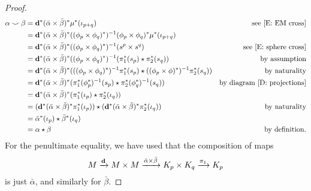 \begin{proof}
\begin{comment}
Now, we consider the diagram
\begin{diagram}
H^{p+q}(M)&\lTo^{\diag^*(\bar \alpha\times \bar \beta)^*}& H^{p+q}(\mc K_p\times \mc K_q)&\lTo^{\mu^*}&H^{p+q}(\mc K_{p+q})\\
&&\dTo^{(\phi_p\times \phi_q)^*}&&\dTo^{\phi_{p+q}}\\
&&H^{p+q}(S^p\times S^q)&\lTo^{\nu^*}&H^{p+q}(S^{p+q}).
\end{diagram} 
As the $p+1$ skeleton of $K_p$ can be taken to be the image of $S^p$ under $\phi_p$, it is standard that the vertical maps are isomorphisms. 

Again by \cite[Section 4.3]{Hatc02}, $\mu^*(\iota_{p+q})=\iota_p\times \iota_q$, so $\alpha\smile \beta=\diag^*(\bar \alpha\times \bar \beta)^*(\iota_p\times \iota_q)$. So we compute as follows.
\end{comment}

\begin{align*}
\alpha\smile \beta&=\mathbf{d}^*(\bar \alpha\times \bar \beta)^*\mu^*(\iota_{p+q})&\text{see \eqref{E: EM cross}}\\
&=\mathbf{d}^*(\bar \alpha\times \bar \beta)^*((\phi_p\times \phi_q)^*)^{-1}(\phi_p\times \phi_q)^*\mu^*(\iota_{p+q})\\
&=\mathbf{d}^*(\bar \alpha\times \bar \beta)^*((\phi_p\times \phi_q)^*)^{-1}(s^p\times s^q)&\text{see \eqref{E: sphere cross}}\\
&=\mathbf{d}^*(\bar \alpha\times \bar \beta)^*((\phi_p\times \phi_q)^*)^{-1}(\pi_1^*(s_p) \star \pi_2^*(s_q))&\text{by assumption}\\
&=\mathbf{d}^*(\bar \alpha\times \bar \beta)^*(((\phi_p\times \phi_q)^*)^{-1}\pi_1^*(s_p) \star ((\phi_p\times \phi)^*)^{-1}\pi_2^*(s_q))&\text{by naturality}\\
&=\mathbf{d}^*(\bar \alpha\times \bar \beta)^*(\pi_1^*(\phi_p^*)^{-1}(s_p) \star \pi_2^*(\phi_q^*)^{-1}(s_q))&\text{by diagram \eqref{D: projections}}\\
&=\mathbf{d}^*(\bar \alpha\times \bar \beta)^*(\pi_1^*(\iota_p) \star \pi_2^*(\iota_q))\\
&=(\mathbf{d}^*(\bar \alpha\times \bar \beta)^*\pi_1^*(\iota_p)) \star (\mathbf{d}^*(\bar \alpha\times \bar \beta)^*\pi_2^*(\iota_q))&\text{by naturality}\\
&=\bar\alpha^*(\iota_p) \star \bar\beta^*(\iota_q)\\
&=\alpha\star\beta &\text{by definition}.
\end{align*}
For the penultimate equality, we have used that the composition of maps $$M\xrightarrow{\mathbf{d}}M\times M\xrightarrow{\bar\alpha\times \bar \beta}K_p\times K_q\xrightarrow{\pi_1}K_p$$ is just $\bar \alpha$, and similarly for $\bar \beta$.
\end{proof}


